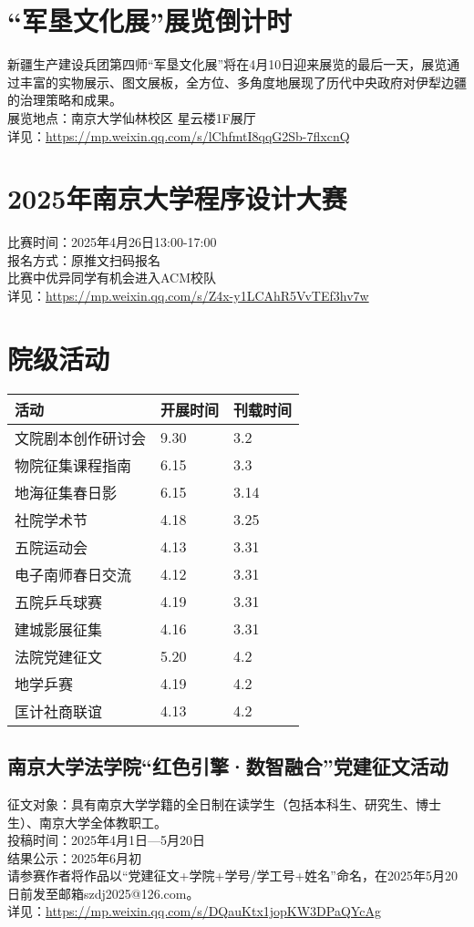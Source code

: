 \documentclass[letterpaper, 12pt]{article}
\begin{document}
\begin{multicols}{2}
\section{“军垦文化展”展览倒计时}
新疆生产建设兵团第四师“军垦文化展”将在4月10日迎来展览的最后一天，展览通过丰富的实物展示、图文展板，全方位、多角度地展现了历代中央政府对伊犁边疆的治理策略和成果。
\\展览地点：南京大学仙林校区 星云楼1F展厅
\\详见：\url{https://mp.weixin.qq.com/s/lChfmtI8qqG2Sb-7flxcnQ}


\section{2025年南京大学程序设计大赛}
比赛时间：2025年4月26日13:00-17:00
\\报名方式：原推文扫码报名
\\比赛中优异同学有机会进入ACM校队
\\详见：\url{https://mp.weixin.qq.com/s/Z4x-y1LCAhR5VvTEf3hv7w}

\section{院级活动}
\begin{tabular}{|>{\centering\arraybackslash}m{}|m{}|m{}|}
\hline
    活动 & 开展时间 & 刊载时间\\
    \hline\hline
    文院剧本创作研讨会 & 9.30 & 3.2\\
    物院征集课程指南 & 6.15 & 3.3\\
    地海征集春日影 & 6.15 & 3.14\\
    社院学术节 & 4.18 & 3.25\\
    五院运动会 & 4.13 & 3.31\\
    电子南师春日交流 & 4.12 & 3.31\\
    五院乒乓球赛 & 4.19 & 3.31\\
    建城影展征集 & 4.16 & 3.31\\
    法院党建征文 & 5.20 & 4.2\\
    地学乒赛 & 4.19 & 4.2\\
    匡计社商联谊 & 4.13 & 4.2\\
    
    \hline
\end{tabular}

\subsection{南京大学法学院“红色引擎·数智融合”党建征文活动}
征文对象：具有南京大学学籍的全日制在读学生（包括本科生、研究生、博士生）、南京大学全体教职工。
\\投稿时间：2025年4月1日—5月20日 
\\结果公示：2025年6月初  
\\请参赛作者将作品以“党建征文+学院+学号/学工号+姓名”命名，在2025年5月20日前发至邮箱szdj2025@126.com。
\\详见：\url{https://mp.weixin.qq.com/s/DQauKtx1jopKW3DPaQYcAg}


\end{multicols}
\end{document}
